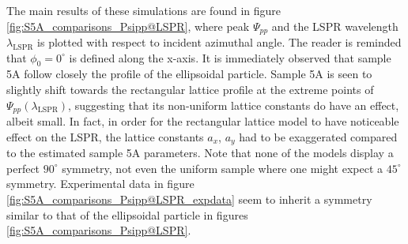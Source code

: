 The main results of these simulations are found in figure \ref{fig:S5A_comparisons_Psipp@LSPR}, where peak $\Psi_{pp}$ and the LSPR wavelength $\lambda_\text{LSPR}$ is plotted with respect to incident azimuthal angle. The reader is reminded that $\phi_0=0^\circ$ is defined along the x-axis. It is immediately observed that sample 5A follow closely the profile of the ellipsoidal particle. Sample 5A is seen to slightly shift towards the rectangular lattice profile at the extreme points of $\Psi_{pp}(\lambda_\text{LSPR})$, suggesting that its non-uniform lattice constants do have an effect, albeit small. In fact, in order for the rectangular lattice model to have noticeable effect on the LSPR, the lattice constants $a_x$, $a_y$ had to be exaggerated compared to the estimated sample 5A parameters.  Note that none of the models display a perfect $90^\circ$ symmetry, not even the uniform sample where one might expect a $45^\circ$ symmetry. Experimental data in figure \ref{fig:S5A_comparisons_Psipp@LSPR_expdata} seem to inherit a symmetry similar to that of the ellipsoidal particle in figures \ref{fig:S5A_comparisons_Psipp@LSPR}.

